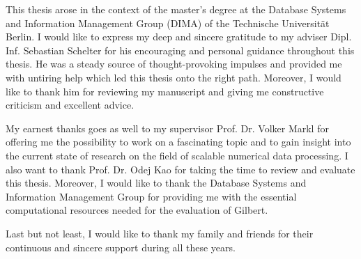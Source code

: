 \clearemptydoublepage
{}
{}	


\vspace*{2cm}

\begin{center}
\end{center}

\vspace{1cm}

This thesis arose in the context of the master’s degree at the Database Systems and Information Management Group (DIMA) of the Technische Universität Berlin. 
I would like to express my deep and sincere gratitude to my adviser Dipl. Inf. Sebastian Schelter for his encouraging and personal guidance throughout this thesis. 
He was a steady source of thought-provoking impulses and provided me with untiring help which led this thesis onto the right path. 
Moreover, I would like to thank him for reviewing my manuscript and giving me constructive criticism and excellent advice.

My earnest thanks goes as well to my supervisor Prof. Dr. Volker Markl for offering me the possibility to work on a fascinating topic and to gain insight into the current state of research on the field of scalable numerical data processing.
I also want to thank Prof. Dr. Odej Kao for taking the time to review and evaluate this thesis.
Moreover, I would like to thank the Database Systems and Information Management Group for providing me with the essential computational resources needed for the evaluation of Gilbert.

Last but not least, I would like to thank my family and friends for their continuous and sincere support during all these years.